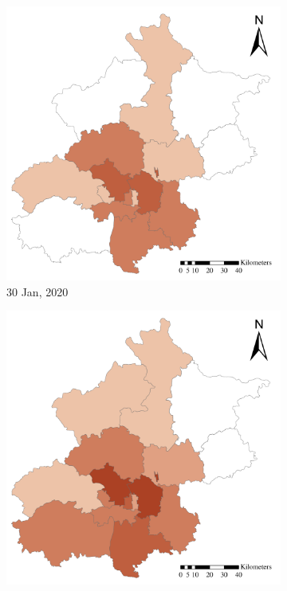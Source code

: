 \documentclass[ijgi,submit,moreauthors,pdftex]{Definitions/mdpi}
\begin{document}
\begin{figure}[ht]
\begin{subfigure}{.23\textwidth}
        \includegraphics[width=\textwidth]{Figures/ConfirmedDistrictD2020_01_30-eps-converted-to.pdf}
        \caption{30 Jan, 2020}
    \end{subfigure}
    \begin{subfigure}{.23\textwidth}
        \includegraphics[width=\textwidth]{Figures/ConfirmedDistrictD2020_02_05-eps-converted-to.pdf}

\end{subfigure}
\end{figure}
\end{document}
